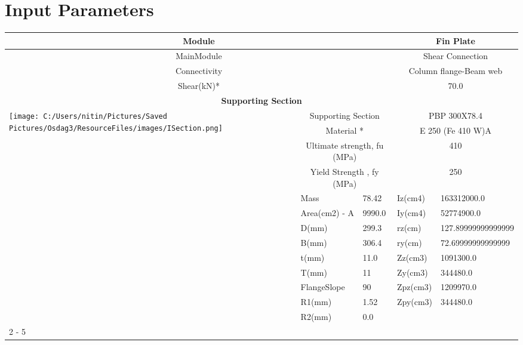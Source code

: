 \documentclass{article}%
\begin{document}
%
\normalsize%
\pagestyle{header}%
\section{Input Parameters}%
\label{sec:InputParameters}%
\renewcommand{\arraystretch}{1.2}%
\begin{longtable}{|p{5cm}|p{2cm}|p{2cm}|p{2cm}|p{5cm}|}%
\hline%
\hline%
\multicolumn{3}{|c|}{Module}&\multicolumn{2}{|c|}{Fin Plate}\\%
\hline%
\hline%
\multicolumn{3}{|c|}{MainModule}&\multicolumn{2}{|c|}{Shear Connection}\\%
\hline%
\hline%
\multicolumn{3}{|c|}{Connectivity}&\multicolumn{2}{|c|}{Column flange{-}Beam web}\\%
\hline%
\hline%
\multicolumn{3}{|c|}{Shear(kN)*}&\multicolumn{2}{|c|}{70.0}\\%
\hline%
\hline%
\multicolumn{5}{|c|}{\textbf{Supporting Section}}\\%
\hline%
\hline%
\multirow{13}{*}{\texttt{[image: C:/Users/nitin/Pictures/Saved Pictures/Osdag3/ResourceFiles/images/ISection.png]}}&\multicolumn{2}{|c|}{Supporting Section}&\multicolumn{2}{|c|}{PBP 300X78.4}\\%
\cline{2%
-%
5}%
&\multicolumn{2}{|c|}{Material *}&\multicolumn{2}{|c|}{E 250 (Fe 410 W)A}\\%
\cline{2%
-%
5}%
&\multicolumn{2}{|c|}{Ultimate strength, fu (MPa)}&\multicolumn{2}{|c|}{410}\\%
\cline{2%
-%
5}%
&\multicolumn{2}{|c|}{Yield Strength , fy (MPa)}&\multicolumn{2}{|c|}{250}\\%
\cline{2%
-%
5}%
&Mass&78.42&Iz(cm4)&163312000.0\\%
\cline{2%
-%
5}%
&Area(cm2) {-} A&9990.0&Iy(cm4)&52774900.0\\%
\cline{2%
-%
5}%
&D(mm)&299.3&rz(cm)&127.89999999999999\\%
\cline{2%
-%
5}%
&B(mm)&306.4&ry(cm)&72.69999999999999\\%
\cline{2%
-%
5}%
&t(mm)&11.0&Zz(cm3)&1091300.0\\%
\cline{2%
-%
5}%
&T(mm)&11&Zy(cm3)&344480.0\\%
\cline{2%
-%
5}%
&FlangeSlope&90&Zpz(cm3)&1209970.0\\%
\cline{2%
-%
5}%
&R1(mm)&1.52&Zpy(cm3)&344480.0\\%
\cline{2%
-%
5}%
&R2(mm)&0.0&&\\%
\cline{2%
-%
5}%
\hline%
\multicolumn{5}{|c|}{\textbf{Supported Section}}\\%

\end{longtable}
\end{document}

